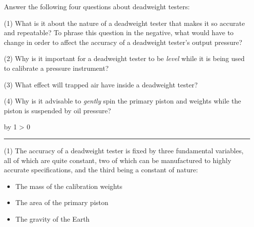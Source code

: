 \documentclass[12pt,a4paper]{article}
\def\svar{
           \advance\answnum by 1
           \ifnum \answnum > 0
                \hrule
                \vskip 3pt
                \leftline{Svar \the\answnum}
                \vskip 3pt \fi}
\begin{document}
Answer the following four questions about deadweight testers:


\vskip 10pt {\narrower \noindent \baselineskip5pt

\noindent
(1) What is it about the nature of a deadweight tester that makes it so accurate and repeatable?  To phrase this question in the negative, what would have to change in order to affect the accuracy of a deadweight tester's output pressure?

\par} \vskip 10pt




\vskip 10pt {\narrower \noindent \baselineskip5pt

\noindent
(2) Why is it important for a deadweight tester to be {\it level} while it is being used to calibrate a pressure instrument?

\par} \vskip 10pt



\vskip 10pt {\narrower \noindent \baselineskip5pt

\noindent
(3) What effect will trapped air have inside a deadweight tester?

\par} \vskip 10pt




\vskip 10pt {\narrower \noindent \baselineskip5pt

\noindent
(4) Why is it advisable to {\it gently} spin the primary piston and weights while the piston is suspended by oil pressure?

\par} \vskip 10pt



\vskip 10pt \filbreak 





\svar{} 

\vskip 10pt {\narrower \noindent \baselineskip5pt

\noindent
(1) The accuracy of a deadweight tester is fixed by three fundamental variables, all of which are quite constant, two of which can be manufactured to highly accurate specifications, and the third being a constant of nature:

\begin{itemize}
\item{} The mass of the calibration weights
\item{} The area of the primary piston
\item{} The gravity of the Earth
\end{itemize}

\par} \vskip 10pt
\end{document}
